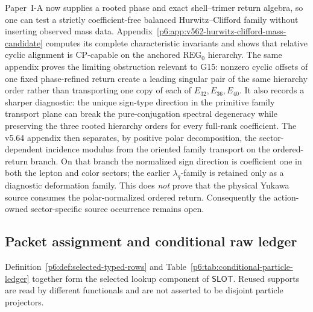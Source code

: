 \documentclass[11pt,a4paper]{article}
\begin{document}
\begin{remark}
\label{p6:rem:v562-hurwitz-clifford-candidate-scope}
Paper~I-A now supplies a rooted phase and exact shell--trimer return algebra,
so one can test a strictly coefficient-free balanced Hurwitz--Clifford family
without inserting observed mass data.  Appendix~\ref{p6:app:v562-hurwitz-clifford-mass-candidate}
computes its complete characteristic invariants and shows that relative
cyclic alignment is CP-capable on the anchored \(\mathrm{REG}_0\) hierarchy.
The same appendix proves the limiting obstruction relevant to G15: nonzero
cyclic offsets of one fixed phase-refined return create a leading singular
pair of the same hierarchy order rather than transporting one copy of each
of \(E_{32},E_{36},E_{40}\).  It also records a sharper diagnostic: the
unique sign-type direction in the primitive family transport plane can break
the pure-conjugation spectral degeneracy while preserving the three rooted
hierarchy orders for every full-rank coefficient.  The v5.64 appendix then
separates, by positive polar decomposition, the sector-dependent incidence
modulus from the oriented family transport on the ordered-return branch.  On
that branch the normalized sign direction is coefficient one in both the
lepton and color sectors; the earlier \(\lambda_q\)-family is retained only
as a diagnostic deformation family.  This does \emph{not} prove that the
physical Yukawa source consumes the polar-normalized ordered return.
Consequently the action-owned sector-specific source occurrence remains
open.
\end{remark}

\subsection{Packet assignment and conditional raw ledger}
\label{p6:sec:conditional-packet-ledger}

\begin{remark}
\label{p6:rem:selected-slot-map}
Definition~\ref{p6:def:selected-typed-rows} and
Table~\ref{p6:tab:conditional-particle-ledger} together form the selected
lookup component of \(\mathsf{SLOT}\).  Reused supports are read by different
functionals and are not asserted to be disjoint particle projectors.
\end{remark}
\end{document}

